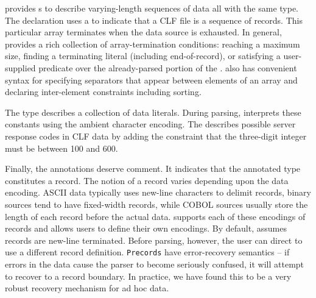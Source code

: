 \documentclass[10pt]{article}
\begin{document}
\pads{} provides s to describe varying-length sequences of
data all with the same type.  The  declaration  uses a
 to indicate that a CLF file is a sequence of 
records.  This particular array terminates when the data source is
exhausted. In general, \pads{} provides a rich
collection of array-termination conditions: reaching a maximum size,
finding a terminating literal (including end-of-record), or satisfying a
user-supplied predicate over the already-parsed portion of the . 
\pads{} also has convenient syntax for 
specifying separators that appear between elements of an array and
declaring inter-element constraints including sorting.

The
 type  describes a collection of data literals.
During parsing, \pads{} interprets these constants using the ambient
character encoding.  The   describes
possible server response codes in CLF data by adding the constraint
that the three-digit integer must be between 100 and 600.

Finally, the  annotations deserve comment. It
indicates that the annotated type constitutes a record.  
The notion of a record varies depending upon the data encoding.  
ASCII data typically uses new-line characters to delimit 
records, binary sources tend to have fixed-width records, while 
COBOL sources usually store the length of each record before the actual data.
\pads{} supports each of these encodings of records and allows users to define
their own encodings.  By default, \pads{} assumes records are new-line terminated.
Before parsing, however, the user can direct \pads{} to use a different record
definition.
\texttt{Precords} have error-recovery semantics -- if errors 
in the data cause the parser to become seriously confused,
it will attempt to recover to a record boundary.
In practice, we have found this to be a very robust recovery mechanism
for ad hoc data.  
\end{document}

